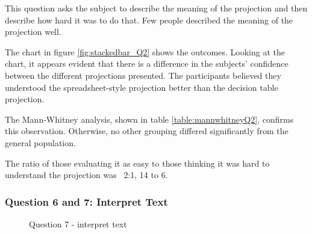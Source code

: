 This question asks the subject to describe the meaning of the projection and then describe how hard it was to do that.
Few people described the meaning of the projection well.

The chart in figure \ref{fig:stackedbar_Q2} shows the outcomes.
Looking at the chart, it appears evident that there is a difference in the subjects' confidence between the different projections presented.
The participants believed they understood the spreadsheet-style projection better than the decision table projection.

The Mann-Whitney analysis, shown in table \ref{table:mannwhitneyQ2}, confirms this observation.
Otherwise, no other grouping differed significantly from the general population.

The ratio of those evaluating it as easy to those thinking it was hard to understand the projection was ~2:1, 14 to 6.

\subsubsection{Question 6 and 7: Interpret Text}

\begin{figure}[H]
    \centering
    \caption{Question 7 - interpret text}
    \label{fig:stackedbar_Q3}
\end{figure}

